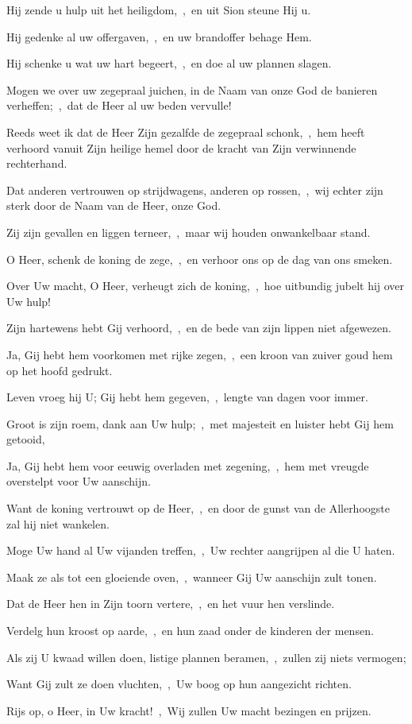\documentclass[12pt,twoside,a5paper]{article}
\begin{document}
\begin{halfparskip}
  Hij zende u hulp uit het heiligdom,~\sep\ en uit Sion steune Hij u.

  Hij gedenke al uw offergaven,~\sep\ en uw brandoffer behage Hem.

  Hij schenke u wat uw hart begeert,~\sep\ en doe al uw plannen slagen.

  Mogen we over uw zegepraal juichen, in de Naam van onze God de banieren verheffen;~\sep\ dat de Heer al uw beden vervulle!

  Reeds weet ik dat de Heer Zijn gezalfde de zegepraal schonk,~\sep\ hem heeft verhoord vanuit Zijn heilige hemel door de kracht van Zijn verwinnende rechterhand.

  Dat anderen vertrouwen op strijdwagens, anderen op rossen,~\sep\ wij echter zijn sterk door de Naam van de Heer, onze God.

  Zij zijn gevallen en liggen terneer,~\sep\ maar wij houden onwankelbaar stand.

  O Heer, schenk de koning de zege,~\sep\ en verhoor ons op de dag van ons smeken.

   Over Uw macht, O Heer, verheugt zich de koning,~\sep\ hoe uitbundig jubelt hij over Uw hulp!

  Zijn hartewens hebt Gij verhoord,~\sep\ en de bede van zijn lippen niet afgewezen.

  Ja, Gij hebt hem voorkomen met rijke zegen,~\sep\ een kroon van zuiver goud hem op het hoofd gedrukt.

  Leven vroeg hij U; Gij hebt hem gegeven,~\sep\ lengte van dagen voor immer.

  Groot is zijn roem, dank aan Uw hulp;~\sep\ met majesteit en luister hebt Gij hem getooid,

  Ja, Gij hebt hem voor eeuwig overladen met zegening,~\sep\ hem met vreugde overstelpt voor Uw aanschijn.

  Want de koning vertrouwt op de Heer,~\sep\ en door de gunst van de Allerhoogste zal hij niet wankelen.

  Moge Uw hand al Uw vijanden treffen,~\sep\ Uw rechter aangrijpen al die U haten.

  Maak ze als tot een gloeiende oven,~\sep\ wanneer Gij Uw aanschijn zult tonen.

  Dat de Heer hen in Zijn toorn vertere,~\sep\ en het vuur hen verslinde.

  Verdelg hun kroost op aarde,~\sep\ en hun zaad onder de kinderen der mensen.

  Als zij U kwaad willen doen, listige plannen beramen,~\sep\ zullen zij niets vermogen;

  Want Gij zult ze doen vluchten,~\sep\ Uw boog op hun aangezicht richten.

  Rijs op, o Heer, in Uw kracht!~\sep\ Wij zullen Uw macht bezingen en prijzen.
\end{halfparskip}
\end{document}

